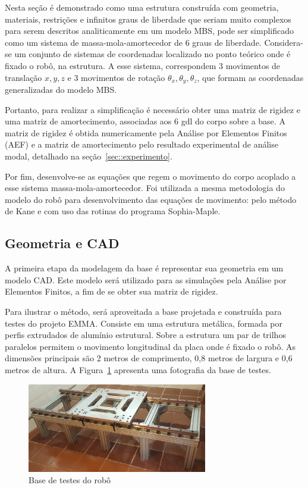 Nesta seção é demonstrado como uma estrutura construída com geometria,
materiais, restrições e infinitos graus de liberdade que seriam muito complexos
para serem descritos analiticamente em um modelo MBS, pode ser simplificado como
um sistema de massa-mola-amortecedor de 6 graus de liberdade.
Considera-se um conjunto de sistemas de coordenadas localizado no ponto teórico
onde é fixado o robô, na estrutura. A esse sistema, correspondem 3 movimentos de
translação $x,y,z$ e 3 movimentos de rotação $\theta_x, \theta_y, \theta_z$, que
formam as coordenadas generalizadas do modelo MBS.

Portanto, para realizar a simplificação é necessário obter uma matriz de rigidez
e uma matriz de amortecimento, associadas aos 6 gdl do corpo sobre a base. A
matriz de rigidez é obtida numericamente pela Análise por Elementos Finitos
(AEF) e a matriz de amortecimento pelo resultado experimental de análise modal,
detalhado na seção~\ref{sec::experimento}.

Por fim, desenvolve-se as equações que regem o movimento do corpo acoplado a
esse sistema massa-mola-amortecedor.
Foi utilizada a mesma metodologia do modelo do robô para desenvolvimento das
equações de movimento: pelo método de Kane e com uso das rotinas do programa
Sophia-Maple.

\subsection{Geometria e CAD}

A primeira etapa da modelagem da base é representar sua geometria em um modelo
CAD. Este modelo será utilizado para as simulações pela Análise por Elementos
Finitos, a fim de se obter sua matriz de rigidez.

Para ilustrar o método, será aproveitada a base projetada e construída para
testes do projeto EMMA. Consiste em uma estrutura metálica, formada por perfis
extrudados de alumínio estrutural. Sobre a estrutura um par de trilhos paralelos
permitem o movimento longitudinal da placa onde é fixado o robô. As dimensões
principais são 2 metros de comprimento, 0,8 metros de largura e 0,6 metros de
altura. A Figura~\ref{fig::estrut_modelo_fisico} apresenta uma fotografia da
base de testes.

\begin{figure}[h]
	\centering 
 	\includegraphics[width=0.70\textwidth]{figs/estrut_modelo_fisico}
 	\caption{Base de testes do robô}
 	\label{fig::estrut_modelo_fisico}
\end{figure}

